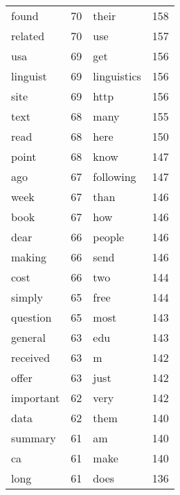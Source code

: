 \documentclass[10pt, a4paper]{article}
\begin{document}
\begin{tabular}{l c l c}
found & 70 & their & 158 \\
related & 70 & use & 157 \\
usa & 69 & get & 156 \\
linguist & 69 & linguistics & 156 \\
site & 69 & http & 156 \\
text & 68 & many & 155 \\
read & 68 & here & 150 \\
point & 68 & know & 147 \\
ago & 67 & following & 147 \\
week & 67 & than & 146 \\
book & 67 & how & 146 \\
dear & 66 & people & 146 \\
making & 66 & send & 146 \\
cost & 66 & two & 144 \\
simply & 65 & free & 144 \\
question & 65 & most & 143 \\
general & 63 & edu & 143 \\
received & 63 & m & 142 \\
offer & 63 & just & 142 \\
important & 62 & very & 142 \\
data & 62 & them & 140 \\
summary & 61 & am & 140 \\
ca & 61 & make & 140 \\
long & 61 & does & 136 \\
\end{tabular}
\end{document}
